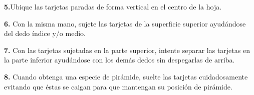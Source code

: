 \documentclass{article}
\begin{document}
\textbf{5.}Ubique las tarjetas paradas de forma vertical en el centro de la hoja.
\vspace{0.5cm}

\textbf{6.} Con la misma mano, sujete las tarjetas de la superficie superior ayudándose del dedo índice y/o medio.
\vspace{0.5cm}

\textbf{7.} Con las tarjetas sujetadas en la parte superior, intente separar las tarjetas en la parte inferior ayudándose con los demás dedos sin despegarlas de arriba. 
\vspace{0.5cm}

\textbf{8.} Cuando obtenga una especie de pirámide, suelte las tarjetas cuidadosamente evitando que éstas se caigan para que mantengan su posición de pirámide.
\end{document}
